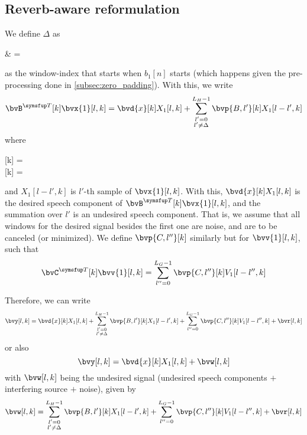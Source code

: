 \subsection{Reverb-aware reformulation}

We define $\Delta$ as
\begin{equations}
	\Delta 
	& = 
\end{equations}
as the window-index that starts when $b_1[n]$ starts (which happens given the pre-processing done in \cref{subsec:zero_padding}). With this, we write
\begin{equation}
	\tr{\bvB}[k] \bvx{1}[l,k] = \bvd{x}[k] X_1[l,k] + \sum_{\substack{l'=0 \\ l' \neq \Delta}}^{L_H-1} \bvp{B,l'}[k] X_1[l-l',k]
\end{equation}
where
\begin{subgather}
	 = \tr{ \tup{ \bvB{[\Delta,0]}[k] , \cdots , \bvB{[\Delta,M-1]}[k] } } \\
	 = \tr{ \tup{ \bvB{[l',0]}[k] , \cdots , \bvB{[l',M-1]}[k] } } 
\end{subgather}
and $X_1[l-l',k]$ is $l'$-th sample of $\bvx{1}[l,k]$. With this, $\bvd{x}[k] X_1[l,k]$ is the desired speech component of $\tr{\bvB}[k] \bvx{1}[l,k]$, and the summation over $l'$ is an undesired speech component. That is, we assume that all windows for the desired signal besides the first one are noise, and are to be canceled (or minimized). We define $\bvp{C,l''}[k]$ similarly but for $\bvv{1}[l,k]$, such that
\begin{equation}
	\tr{\bvC}[k] \bvv{1}[l,k] = \sum_{l''=0}^{L_G-1} \bvp{C,l''}[k] V_1[l-l'',k]
\end{equation}

Therefore, we can write
\begin{equation}
	\bvy[l,k] = \bvd{x}[k] X_1[l,k] + \sum_{\substack{l'=0 \\ l' \neq \Delta}}^{L_H-1} \bvp{B,l'}[k] X_1[l-l',k] + \sum_{l''=0}^{L_G-1} \bvp{C,l''}[k] V_1[l-l'',k] + \bvr[l,k]
\end{equation}
or also
\begin{equation}
	\bvy[l,k] = \bvd{x}[k] X_1[l,k] + \bvw[l,k]
\end{equation}
with $\bvw[l,k]$ being the undesired signal (undesired speech components $+$ interfering source $+$ noise), given by
\begin{equation}\label{eq:bvw_sum_components}
	\bvw[l,k] = \sum_{\substack{l'=0 \\ l' \neq \Delta}}^{L_H-1} \bvp{B,l'}[k] X_1[l-l',k] + \sum_{l''=0}^{L_G-1} \bvp{C,l''}[k] V_1[l-l'',k] + \bvr[l,k]
\end{equation}

